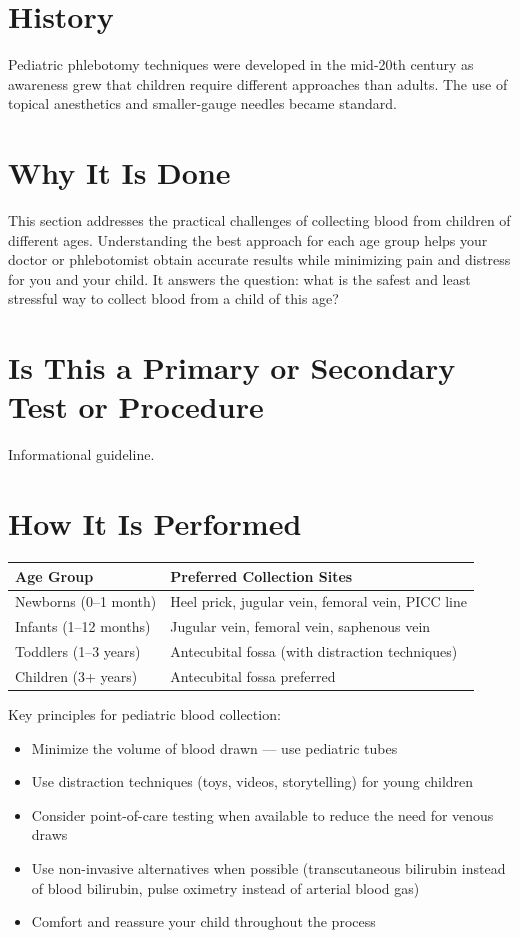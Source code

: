 \section*{History}
Pediatric phlebotomy techniques were developed in the mid-20th century as awareness grew that children require different approaches than adults. The use of topical anesthetics and smaller-gauge needles became standard.

\section*{Why It Is Done}
This section addresses the practical challenges of collecting blood from children of different ages. Understanding the best approach for each age group helps your doctor or phlebotomist obtain accurate results while minimizing pain and distress for you and your child. It answers the question: what is the safest and least stressful way to collect blood from a child of this age?

\section*{Is This a Primary or Secondary Test or Procedure}
Informational guideline.

\section*{How It Is Performed}

\begin{longtable}{@{}ll@{}}
\toprule
\textbf{Age Group} & \textbf{Preferred Collection Sites} \\
\midrule
Newborns (0--1 month) & Heel prick, jugular vein, femoral vein, PICC line \\
Infants (1--12 months) & Jugular vein, femoral vein, saphenous vein \\
Toddlers (1--3 years) & Antecubital fossa (with distraction techniques) \\
Children (3+ years) & Antecubital fossa preferred \\
\bottomrule
\end{longtable}

Key principles for pediatric blood collection:
\begin{itemize}
\item Minimize the volume of blood drawn --- use pediatric tubes
\item Use distraction techniques (toys, videos, storytelling) for young children
\item Consider point-of-care testing when available to reduce the need for venous draws
\item Use non-invasive alternatives when possible (transcutaneous bilirubin instead of blood bilirubin, pulse oximetry instead of arterial blood gas)
\item Comfort and reassure your child throughout the process
\end{itemize}

